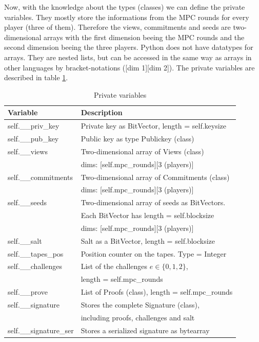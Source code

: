 \documentclass[]{article}
\begin{document}
\noindent Now, with the knowledge about the types (classes) we can define the private variables. They mostly store the informations from the MPC rounds for every player (three of them). Therefore the views, commitments and seeds are two-dimensional arrays with the first dimension beeing the MPC rounds and the second dimension beeing the three players. Python does not have datatypes for arrays. They are nested lists, but can be accessed in the same way as arrays in other languages by bracket-notations ([dim 1][dim 2]). The private variables are described in table \ref{tab:privvars}.
\begin{table}[htbp]
\begin{center}
\begin{tabular}{|l|l|}
\hline
\textbf{Variable}  & \textbf{Description} \\ \hline
self.\_\_priv\_key    & Private key as BitVector, length = self.keysize\\ \hline
self.\_\_pub\_key     & Public key as type Publickey (class)\\ \hline  
self.\_\_views        & Two-dimensional array of Views (class)\\
			          & dims: [self.mpc\_rounds][3 (players)]\\ \hline
self.\_\_commitments  & Two-dimensional array of Commitments (class)\\
					  & dims: [self.mpc\_rounds][3 (players)] \\ \hline
self.\_\_seeds 		  & Two-dimensional array of seeds as BitVectors.\\
			          & Each BitVector has length = self.blocksize\\ 
			          & dims: [self.mpc\_rounds][3 (players)] \\ \hline
self.\_\_salt  		  & Salt as a BitVector, length = self.blocksize\\ \hline
self.\_\_tapes\_pos  & Position counter on the tapes. Type = Integer\\ \hline
self.\_\_challenges  & List of the challenges $e \in \{0,1,2\}$,\\
					  & length = self.mpc\_rounds \\ \hline
self.\_\_prove       & List of Proofs (class), length = self.mpc\_rounds\\ \hline
self.\_\_signature   & Stores the complete Signature (class),\\
					  & including proofs, challenges and salt \\ \hline
self.\_\_signature\_ser & Stores a serialized signature as bytearray\\ \hline
\end{tabular}
\caption{Private variables}
\label{tab:privvars}
\end{center}
\end{table}
\end{document}
